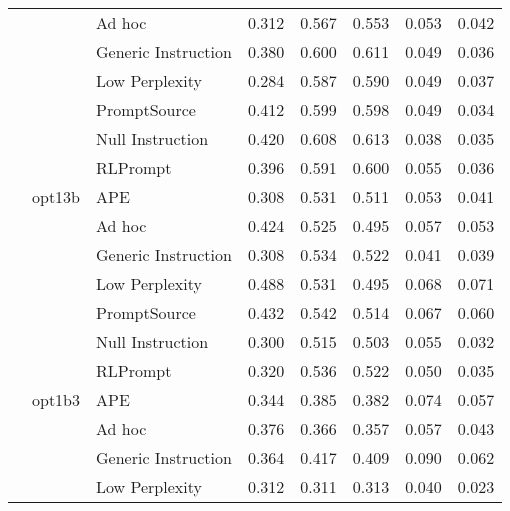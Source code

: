 \begin{supertabular}{lllrrrrr}
              &        & Ad hoc &            0.312 &           0.567 &          0.553 &        0.053 &    0.042 \\
              &        & Generic Instruction &            0.380 &           0.600 &          0.611 &        0.049 &    0.036 \\
              &        & Low Perplexity &            0.284 &           0.587 &          0.590 &        0.049 &    0.037 \\
              &        & PromptSource &            0.412 &           0.599 &          0.598 &        0.049 &    0.034 \\
              &        & Null Instruction &            0.420 &           0.608 &          0.613 &        0.038 &    0.035 \\
              &        & RLPrompt &            0.396 &           0.591 &          0.600 &        0.055 &    0.036 \\
              & opt13b & APE &            0.308 &           0.531 &          0.511 &        0.053 &    0.041 \\
              &        & Ad hoc &            0.424 &           0.525 &          0.495 &        0.057 &    0.053 \\
              &        & Generic Instruction &            0.308 &           0.534 &          0.522 &        0.041 &    0.039 \\
              &        & Low Perplexity &            0.488 &           0.531 &          0.495 &        0.068 &    0.071 \\
              &        & PromptSource &            0.432 &           0.542 &          0.514 &        0.067 &    0.060 \\
              &        & Null Instruction &            0.300 &           0.515 &          0.503 &        0.055 &    0.032 \\
              &        & RLPrompt &            0.320 &           0.536 &          0.522 &        0.050 &    0.035 \\
              & opt1b3 & APE &            0.344 &           0.385 &          0.382 &        0.074 &    0.057 \\
              &        & Ad hoc &            0.376 &           0.366 &          0.357 &        0.057 &    0.043 \\
              &        & Generic Instruction &            0.364 &           0.417 &          0.409 &        0.090 &    0.062 \\
              &        & Low Perplexity &            0.312 &           0.311 &          0.313 &        0.040 &    0.023 \\

\end{supertabular}
